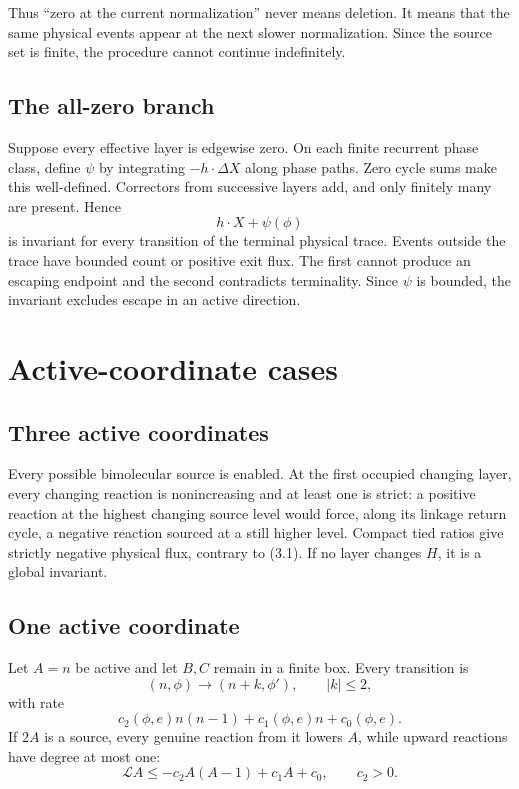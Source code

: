 \documentclass[11pt]{article}
\newcommand{\cL}{\mathcal L}
\begin{document}
Thus ``zero at the current normalization'' never means deletion.  It means
that the same physical events appear at the next slower normalization.
Since the source set is finite, the procedure cannot continue indefinitely.

\subsection{The all-zero branch}

Suppose every effective layer is edgewise zero.  On each finite recurrent
phase class, define \(\psi\) by integrating \(-h\cdot\Delta X\) along phase
paths.  Zero cycle sums make this well-defined.  Correctors from successive
layers add, and only finitely many are present.  Hence
\[
 h\cdot X+\psi(\phi)
\]
is invariant for every transition of the terminal physical trace.  Events
outside the trace have bounded count or positive exit flux.  The first cannot
produce an escaping endpoint and the second contradicts terminality.  Since
\(\psi\) is bounded, the invariant excludes escape in an active direction.

\section{Active-coordinate cases}

\subsection{Three active coordinates}

Every possible bimolecular source is enabled.  At the first occupied changing
layer, every changing reaction is nonincreasing and at least one is strict:
a positive reaction at the highest changing source level would force, along
its linkage return cycle, a negative reaction sourced at a still higher
level.  Compact tied ratios give strictly negative physical flux, contrary
to (3.1).  If no layer changes \(H\), it is a global invariant.

\subsection{One active coordinate}

Let \(A=n\) be active and let \(B,C\) remain in a finite box.  Every transition
is
\[
 (n,\phi)\to(n+k,\phi'),\qquad |k|\le2,
\]
with rate
\[
 c_2(\phi,e)n(n-1)+c_1(\phi,e)n+c_0(\phi,e).
\]
If \(2A\) is a source, every genuine reaction from it lowers \(A\), while
upward reactions have degree at most one:
\[
 \cL A\le-c_2A(A-1)+c_1A+c_0,\qquad c_2>0.
\]
\end{document}
